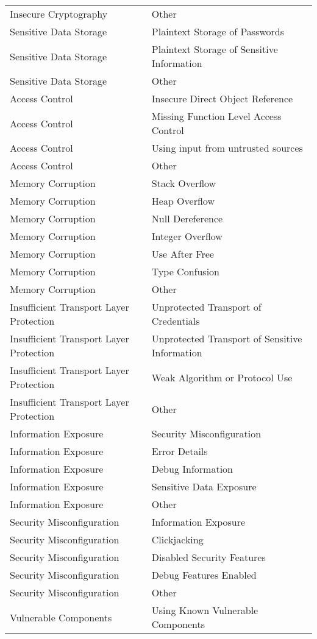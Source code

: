 \begin{longtable}{p{} | p{} }
Insecure Cryptography& Other\\
Sensitive Data Storage& Plaintext Storage of Passwords\\
Sensitive Data Storage& Plaintext Storage of Sensitive Information\\
Sensitive Data Storage& Other\\
Access Control& Insecure Direct Object Reference\\
Access Control& Missing Function Level Access Control\\
Access Control& Using input from untrusted sources\\
Access Control& Other\\
Memory Corruption& Stack Overflow\\
Memory Corruption& Heap Overflow\\
Memory Corruption& Null Dereference\\
Memory Corruption& Integer Overflow\\
Memory Corruption& Use After Free\\
Memory Corruption& Type Confusion\\
Memory Corruption& Other\\
Insufficient Transport Layer Protection& Unprotected Transport of Credentials\\
Insufficient Transport Layer Protection& Unprotected Transport of Sensitive Information\\
Insufficient Transport Layer Protection& Weak Algorithm or Protocol Use\\
Insufficient Transport Layer Protection& Other\\
Information Exposure& Security Misconfiguration\\
Information Exposure& Error Details\\
Information Exposure& Debug Information\\
Information Exposure& Sensitive Data Exposure\\
Information Exposure& Other\\
Security Misconfiguration& Information Exposure\\
Security Misconfiguration& Clickjacking\\
Security Misconfiguration& Disabled Security Features\\
Security Misconfiguration& Debug Features Enabled\\
Security Misconfiguration& Other\\
Vulnerable Components& Using Known Vulnerable Components\\

\end{longtable}
